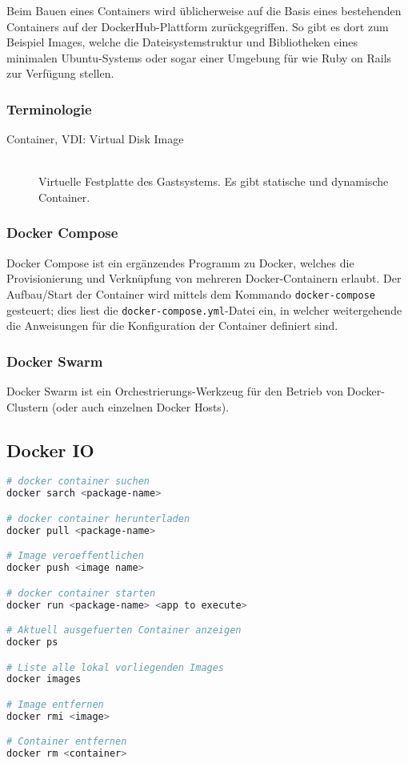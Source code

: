 Beim Bauen eines Containers wird üblicherweise auf die Basis eines bestehenden Containers auf der DockerHub-Plattform zurückgegriffen. So gibt es dort zum Beispiel Images, welche die Dateisystemstruktur und Bibliotheken eines minimalen Ubuntu-Systems oder sogar einer Umgebung für  wie Ruby on Rails zur Verfügung stellen.


\subsubsection{Terminologie}
\begin{description}
	\item[Container, VDI: Virtual Disk Image] \hfill \\
	Virtuelle Festplatte des Gastsystems. Es gibt statische und dynamische Container.
\end{description}


\subsubsection{Docker Compose}

Docker Compose ist ein ergänzendes Programm zu Docker, welches die Provisionierung und Verknüpfung von mehreren Docker-Containern erlaubt. Der Aufbau/Start der Container wird mittels dem Kommando \lstinline|docker-compose| gesteuert; dies liest die \lstinline|docker-compose.yml|-Datei ein, in welcher weitergehende die Anweisungen für die Konfiguration der Container definiert sind.

\subsubsection{Docker Swarm}
Docker Swarm ist ein Orchestrierungs-Werkzeug für den Betrieb von Docker-Clustern (oder auch einzelnen Docker Hosts).



\subsection{Docker IO}
\begin{lstlisting}[language=bash]
# docker container suchen
docker sarch <package-name>

# docker container herunterladen
docker pull <package-name>

# Image veroeffentlichen
docker push <image name>

# docker container starten
docker run <package-name> <app to execute>

# Aktuell ausgefuerten Container anzeigen
docker ps

# Liste alle lokal vorliegenden Images
docker images

# Image entfernen
docker rmi <image>

# Container entfernen
docker rm <container>
\end{lstlisting}


